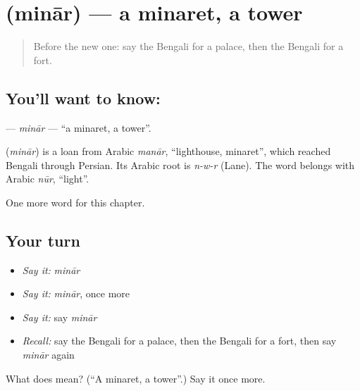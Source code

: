 \section[\texorpdfstring{\bn{মিনার} (minār)}{মিনার (minār)}]{ (minār) — a minaret, a tower}

\label{lesson:BN-C158-minar}



\begin{quote}
Before the new one: say the Bengali for a palace, then the Bengali for a fort.
\end{quote}

\subsection*{You'll want to know: }
\textbf{} — \emph{minār} — \textquotedblleft{}a minaret, a tower\textquotedblright{}.

\begin{cousinweb}
\textbf{} (\emph{minār}) is a loan from Arabic \emph{manār}, \textquotedblleft{}lighthouse, minaret\textquotedblright{}, which reached Bengali through Persian. Its Arabic root is \emph{n-w-r} (Lane). The word belongs with Arabic \emph{nūr}, \textquotedblleft{}light\textquotedblright{}.
\end{cousinweb}

\begin{grammarlens}[title={What you've built}]
One more word for this chapter.
\end{grammarlens}

\subsection*{Your turn}
\begin{itemize}
\raggedright
  \item \emph{Say it:} \emph{minār}
  \item \emph{Say it:} \emph{minār}, once more
  \item \emph{Say it:} say \emph{minār}
  \item \emph{Recall:} say the Bengali for a palace, then the Bengali for a fort, then say \emph{minār} again
\end{itemize}

\begin{tcolorbox}[breakable,colback=teal!4,colframe=teal!35!black,title={Before you move on}]
What does  mean? (\textquotedblleft{}A minaret, a tower\textquotedblright{}.) Say it once more.
\end{tcolorbox}
